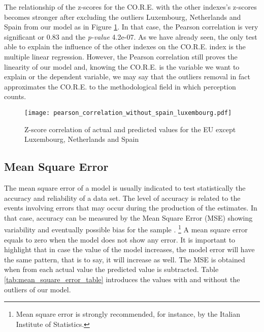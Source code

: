 \documentclass[a4paper, twoside]{report}
\let\oldfootnote\footnote
\renewcommand\footnote[1]{%
\oldfootnote{\hspace{2mm}#1}}
\begin{document}
The relationship of the z-scores for the  CO.R.E. with the other indexes's z-scores becomes stronger after excluding the outliers Luxembourg, Netherlands and Spain from our model as in Figure \ref{fig:pearson_correlation_without_spain_luxembourg}. In that case, the Pearson correlation is very significant or 0.83 and the \textit{p-value} 4.2e-07. As we have already seen, the only test able to explain the influence of the other indexes on the CO.R.E. index is the multiple linear regression. However, the Pearson correlation still proves the linearity of our model and, knowing the CO.R.E. is the variable we want to explain or the dependent variable, we may say that the outliers removal in fact approximates the CO.R.E. to the methodological field in which perception counts.\\ 


\begin{figure}[H]
\centering
	\caption{Z-score correlation of actual and predicted values for the EU except Luxembourg, Netherlands and Spain}
	\texttt{[image: pearson\_correlation\_without\_spain\_luxembourg.pdf]}
	\label{fig:pearson_correlation_without_spain_luxembourg}
\end{figure}


\subsection{Mean Square Error}
\label{mserror}

The mean square error of a model is usually indicated to test statistically the accuracy and reliability of a data set. The level of accuracy is related to the events involving errors that may occur during the production of the estimates. In that case, accuracy can be measured by the Mean Square Error (MSE) showing variability and eventually possible bias for the sample \citep[p. 42]{mean_squared}.\footnote{Mean square error is strongly recommended, for instance, by the Italian Institute of Statistics.} A mean square error equals to zero when the model does not show any error. It is important to highlight that in case the value of the model increases, the model error will have the same pattern, that is to say, it will increase as well. The MSE is obtained when from each actual value the predicted value is subtracted. Table \ref{tab:mean_square_error_table} introduces the values with and without the outliers of our model.\\
 
\end{document}
